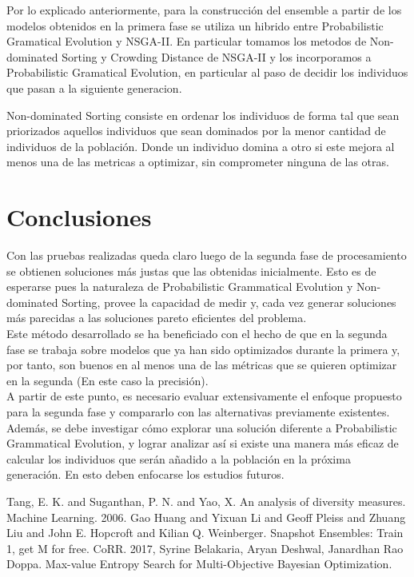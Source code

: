 \documentclass[runningheads,a4paper]{llncs}
\begin{document}
	Por lo explicado anteriormente, para la construcción del ensemble a partir de los modelos obtenidos
    en la primera fase se utiliza un hibrido entre Probabilistic Gramatical Evolution y NSGA-II. En
    particular tomamos los metodos de Non-dominated Sorting y Crowding Distance de NSGA-II y los
    incorporamos a Probabilistic Gramatical Evolution, en particular al paso de decidir los individuos
    que pasan a la siguiente generacion.
	
	Non-dominated Sorting consiste en ordenar los individuos de forma tal que sean priorizados aquellos
	individuos que sean dominados por la menor cantidad de individuos de la población. Donde un individuo
	domina a otro si este mejora al menos una de las metricas a optimizar, sin comprometer ninguna de las
	otras.
	
	\section*{Conclusiones}
	Con las pruebas realizadas queda claro luego de la segunda fase de procesamiento se obtienen soluciones más justas que las obtenidas inicialmente. Esto es de esperarse pues la naturaleza de Probabilistic Grammatical Evolution y Non-dominated Sorting, provee la capacidad de medir y, cada vez generar soluciones más parecidas a las soluciones pareto eficientes del problema.\\
	Este método desarrollado se ha beneficiado con el hecho de que en la segunda fase se trabaja sobre modelos que ya han sido optimizados durante la primera y, por tanto, son buenos en al menos una de las métricas que se quieren optimizar en la segunda (En este caso la precisión).\\
	A partir de este punto, es necesario evaluar extensivamente el enfoque propuesto para la segunda fase y compararlo con las alternativas previamente existentes. Además, se debe investigar cómo explorar una solución diferente a Probabilistic Grammatical Evolution, y lograr analizar así si existe una manera más eficaz de calcular los individuos que serán añadido a la población en la próxima generación. En esto deben enfocarse los estudios futuros.
	
	
	\begin{thebibliography}{4}
		
		 Tang, E. K. and Suganthan, P. N. and Yao, X. An analysis of diversity measures. Machine Learning. 2006.
		 Gao Huang and Yixuan Li and Geoff Pleiss and Zhuang Liu and John E. Hopcroft and Kilian Q. Weinberger. Snapshot Ensembles: Train 1, get {M} for free. CoRR. 2017,
         Syrine Belakaria, Aryan Deshwal, Janardhan Rao Doppa. Max-value Entropy Search for Multi-Objective Bayesian Optimization.
		
	\end{thebibliography}
	
	
\end{document}
